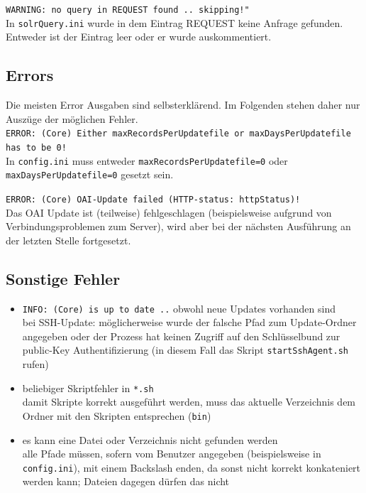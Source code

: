 \documentclass[10pt]{article}
\begin{document}
\texttt{WARNING: no query in REQUEST found .. skipping!"} \\
In \texttt{solrQuery.ini} wurde in dem Eintrag REQUEST keine Anfrage gefunden. Entweder ist der Eintrag leer oder er wurde auskommentiert.


\subsection{Errors}
Die meisten Error Ausgaben sind selbsterklärend. Im Folgenden stehen daher nur Auszüge der möglichen Fehler. \\

\texttt{ERROR: (Core) Either maxRecordsPerUpdatefile or maxDaysPerUpdatefile has to be 0!} \\
In \texttt{config.ini} muss entweder \texttt{maxRecordsPerUpdatefile=0} oder \texttt{maxDaysPerUpdatefile=0} gesetzt sein.

\texttt{ERROR: (Core) OAI-Update failed (HTTP-status: httpStatus)!} \\
Das OAI Update ist (teilweise) fehlgeschlagen (beispielsweise aufgrund von Verbindungsproblemen zum Server), wird aber bei der nächsten Ausführung an der letzten Stelle fortgesetzt.

\subsection{Sonstige Fehler}
\begin{itemize}
	\item \texttt{INFO: (Core) is up to date ..} obwohl neue Updates vorhanden sind \\
		bei SSH-Update: möglicherweise wurde der falsche Pfad zum Update-Ordner angegeben oder der Prozess hat keinen Zugriff auf den Schlüsselbund zur public-Key Authentifizierung (in diesem Fall das Skript \texttt{startSshAgent.sh} rufen)
		
	\item beliebiger Skriptfehler in \texttt{*.sh} \\
		damit Skripte korrekt ausgeführt werden, muss das aktuelle Verzeichnis dem Ordner mit den Skripten entsprechen (\texttt{bin})
		
	\item es kann eine Datei oder Verzeichnis nicht gefunden werden \\
		alle Pfade müssen, sofern vom Benutzer angegeben (beispielsweise in \texttt{config.ini}), mit einem Backslash enden, da sonst nicht korrekt konkateniert werden kann; Dateien dagegen dürfen das nicht
\end{itemize}
\end{document}
